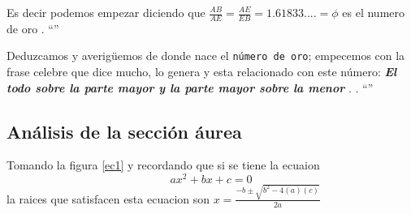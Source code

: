 \documentclass[a4paper]{book}
\newcommand{\pa}[1]{\left(#1\right)}
\begin{document}
Es decir podemos empezar diciendo que $\frac{AB}{AE}=\frac{AE}{EB}=1.61833....=\phi $ es el numero de oro \cite{surhone2010shapiro}  \cite{jackson2012research}. ``''

Deduzcamos y averigüemos de donde nace el \texttt{número de oro}; empecemos con la frase celebre que dice mucho, lo genera y esta relacionado con este  número: \textbf{\textit{El todo sobre la parte mayor y la parte mayor sobre la menor}} \cite{Heinz}. \cite{hilbert2020geometry}. ``''

\subsection{Análisis de la sección áurea}
Tomando la figura \ref{ec1} y recordando que si se tiene la ecuaion $$ax^2+bx+c=0$$ la raices que satisfacen esta ecuacion son $x=\frac{-b\pm\sqrt{b^2-4\pa{a}\pa{c}}}{2a}$
\end{document}
